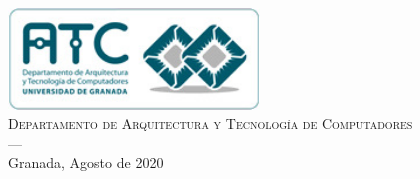\begin{titlepage}
\begin{minipage}{\textwidth}
\includegraphics[width=0.5\textwidth]{imagenes/atc.jpg}\\[0.1cm]
\textsc{Departamento de Arquitectura y Tecnología de Computadores}\\
\textsc{---}\\
Granada, Agosto de 2020
\end{minipage}
\addtolength{\textwidth}{\centeroffset}

 
\end{titlepage}


